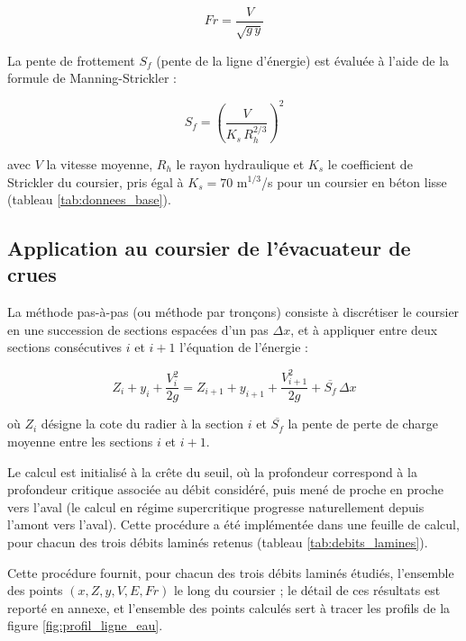 \begin{equation}
Fr = \frac{V}{\sqrt{g \, y}}
\label{eq:froude}
\end{equation}

La pente de frottement $S_f$ (pente de la ligne d'énergie) est évaluée à l'aide de la formule de Manning-Strickler :

\begin{equation}
S_f = \left(\frac{V}{K_s \, R_h^{2/3}}\right)^2
\label{eq:manning_strickler}
\end{equation}

avec $V$ la vitesse moyenne, $R_h$ le rayon hydraulique et $K_s$ le coefficient de Strickler du coursier, pris égal à $K_s = 70$ m$^{1/3}$/s pour un coursier en béton lisse (tableau \ref{tab:donnees_base}).

\subsection{Application au coursier de l'évacuateur de crues}
\label{subsec:application_courbe_remous}

La méthode pas-à-pas (ou méthode par tronçons) consiste à discrétiser le coursier en une succession de sections espacées d'un pas $\Delta x$, et à appliquer entre deux sections consécutives $i$ et $i+1$ l'équation de l'énergie :

\begin{equation}
Z_i + y_i + \frac{V_i^2}{2g} = Z_{i+1} + y_{i+1} + \frac{V_{i+1}^2}{2g} + \overline{S_f}\,\Delta x
\label{eq:energie_pas_a_pas}
\end{equation}

où $Z_i$ désigne la cote du radier à la section $i$ et $\overline{S_f}$ la pente de perte de charge moyenne entre les sections $i$ et $i+1$.

Le calcul est initialisé à la crête du seuil, où la profondeur correspond à la profondeur critique associée au débit considéré, puis mené de proche en proche vers l'aval (le calcul en régime supercritique progresse naturellement depuis l'amont vers l'aval). Cette procédure a été implémentée dans une feuille de calcul, pour chacun des trois débits laminés retenus (tableau \ref{tab:debits_lamines}).

Cette procédure fournit, pour chacun des trois débits laminés étudiés, l'ensemble des points $(x, Z, y, V, E, Fr)$ le long du coursier ; le détail de ces résultats est reporté en annexe, et l'ensemble des points calculés sert à tracer les profils de la figure \ref{fig:profil_ligne_eau}.

